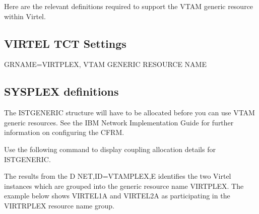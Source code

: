 \documentclass[letterpaper,10pt,english]{sphinxmanual}
\begin{document}
Here are the relevant definitions required to support the VTAM generic resource within Virtel.


\subsection{VIRTEL TCT Settings}
\label{\detokenize{connectivity_guide:index-170}}\label{\detokenize{connectivity_guide:virtel-tct-settings}}
GRNAME=VIRTPLEX, VTAM GENERIC RESOURCE NAME


\subsection{SYSPLEX definitions}
\label{\detokenize{connectivity_guide:sysplex-definitions}}\label{\detokenize{connectivity_guide:index-171}}
The ISTGENERIC structure will have to be allocated before you can use VTAM generic resources. See the IBM Network Implementation Guide for further information on configuring the CFRM.

Use the following command to display coupling allocation details for ISTGENERIC.

\begin{sphinxVerbatim}[commandchars=\\\{\}]
 
\end{sphinxVerbatim}


The results from the D NET,ID=VTAMPLEX,E identifies the two Virtel instances which are grouped into the generic resource name VIRTPLEX. The example below shows VIRTEL1A and VIRTEL2A as participating in the VIRTRPLEX resource name group.
\end{document}

